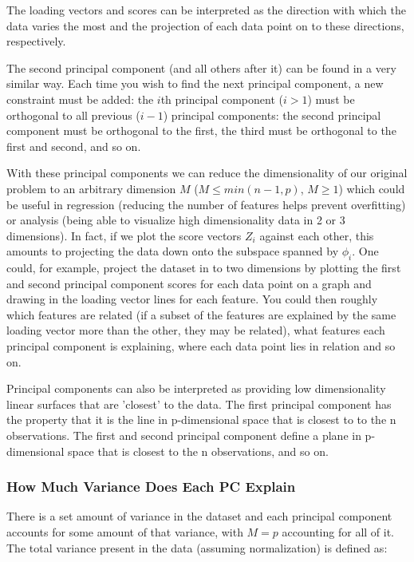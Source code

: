 The loading vectors and scores can be interpreted as the direction with which the data varies the most and the projection of each data point on to these directions, respectively.

The second principal component (and all others after it) can be found in a very similar way. Each time you wish to find the next principal component, a new constraint must be added: the $i$th principal component ($i>1$) must be orthogonal to all previous ($i-1$) principal components: the second principal component must be orthogonal to the first, the third must be orthogonal to the first and second, and so on.

With these principal components we can reduce the dimensionality of our original problem to an arbitrary dimension $M$ ($M\le min(n-1,p)$, $M\ge1$) which could be useful in regression (reducing the number of features helps prevent overfitting) or analysis (being able to visualize high dimensionality data in 2 or 3 dimensions). In fact, if we plot the score vectors $Z_{i}$ against each other, this amounts to projecting the data down onto the subspace spanned by $\phi_{i}$. One could, for example, project the dataset in to two dimensions by plotting the first and second principal component scores for each data point on a graph and drawing in the loading vector lines for each feature. You could then roughly which features are related (if a subset of the features are explained by the same loading vector more than the other, they may be related), what features each principal component is explaining, where each data point lies in relation and so on.

Principal components can also be interpreted as providing low dimensionality linear surfaces that are 'closest' to the data. The first principal component has the property that it is the line in p-dimensional space that is closest to to the n observations. The first and second principal component define a plane in p-dimensional space that is closest to the n observations, and so on.

\subsubsection{How Much Variance Does Each PC Explain}

There is a set amount of variance in the dataset and each principal component accounts for some amount of that variance, with $M=p$ accounting for all of it. The total variance present in the data (assuming normalization) is defined as:

